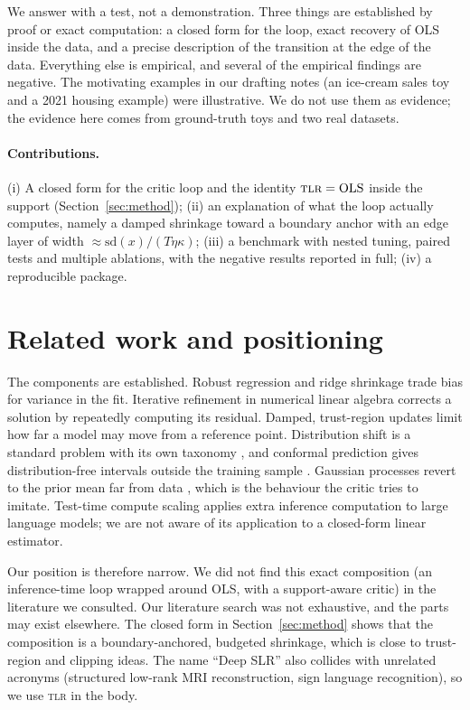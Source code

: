 \documentclass[10pt]{article}
\newcommand{\TLR}{\textsc{tlr}}
\begin{document}
We answer with a test, not a demonstration. Three things are established by proof or exact computation: a closed form for the loop, exact recovery of OLS inside the data, and a precise description of the transition at the edge of the data. Everything else is empirical, and several of the empirical findings are negative. The motivating examples in our drafting notes (an ice-cream sales toy and a 2021 housing example) were illustrative. We do not use them as evidence; the evidence here comes from ground-truth toys and two real datasets.

\paragraph{Contributions.} (i) A closed form for the critic loop and the identity $\TLR=\mathrm{OLS}$ inside the support (Section~\ref{sec:method}); (ii) an explanation of what the loop actually computes, namely a damped shrinkage toward a boundary anchor with an edge layer of width $\approx\mathrm{sd}(x)/(T\eta\kappa)$; (iii) a benchmark with nested tuning, paired tests and multiple ablations, with the negative results reported in full; (iv) a reproducible package.

\section{Related work and positioning}
\label{sec:related}
The components are established. Robust regression \cite{huber1964} and ridge shrinkage \cite{hoerl1970} trade bias for variance in the fit. Iterative refinement in numerical linear algebra \cite{wilkinson1963} corrects a solution by repeatedly computing its residual. Damped, trust-region updates \cite{conn2000} limit how far a model may move from a reference point. Distribution shift is a standard problem with its own taxonomy \cite{quinonero2009}, and conformal prediction gives distribution-free intervals outside the training sample \cite{vovk2005,angelopoulos2021}. Gaussian processes revert to the prior mean far from data \cite{rasmussen2006}, which is the behaviour the critic tries to imitate. Test-time compute scaling \cite{snell2024,wei2022cot} applies extra inference computation to large language models; we are not aware of its application to a closed-form linear estimator.

Our position is therefore narrow. We did not find this exact composition (an inference-time loop wrapped around OLS, with a support-aware critic) in the literature we consulted. Our literature search was not exhaustive, and the parts may exist elsewhere. The closed form in Section~\ref{sec:method} shows that the composition is a boundary-anchored, budgeted shrinkage, which is close to trust-region and clipping ideas. The name ``Deep SLR'' also collides with unrelated acronyms (structured low-rank MRI reconstruction, sign language recognition), so we use \TLR{} in the body.
\end{document}
